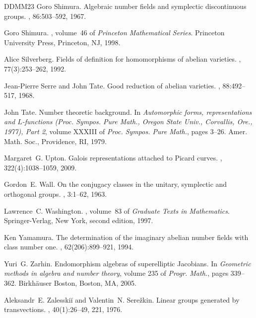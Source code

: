 \documentclass[11pt,a4paper]{article}
\begin{document}
\begin{thebibliography}{DDMM23}
Goro Shimura.
\newblock Algebraic number fields and symplectic discontinuous groups.
, 86:503--592, 1967.

Goro Shimura.
, volume~46 of {\em Princeton Mathematical Series}.
\newblock Princeton University Press, Princeton, NJ, 1998.

Alice Silverberg.
\newblock Fields of definition for homomorphisms of abelian varieties.
, 77(3):253--262, 1992.

Jean-Pierre Serre and John Tate.
\newblock Good reduction of abelian varieties.
, 88:492--517, 1968.

John Tate.
\newblock Number theoretic background.
\newblock In {\em Automorphic forms, representations and {$L$}-functions ({P}roc. {S}ympos. {P}ure {M}ath., {O}regon {S}tate {U}niv., {C}orvallis, {O}re., 1977), {P}art 2}, volume XXXIII of {\em Proc. Sympos. Pure Math.}, pages 3--26. Amer. Math. Soc., Providence, RI, 1979.

Margaret~G. Upton.
\newblock Galois representations attached to {P}icard curves.
, 322(4):1038--1059, 2009.

Gordon~E. Wall.
\newblock On the conjugacy classes in the unitary, symplectic and orthogonal groups.
, 3:1--62, 1963.

Lawrence~C. Washington.
, volume~83 of {\em Graduate Texts in Mathematics}.
\newblock Springer-Verlag, New York, second edition, 1997.

Ken Yamamura.
\newblock The determination of the imaginary abelian number fields with class number one.
, 62(206):899--921, 1994.

Yuri~G. Zarhin.
\newblock Endomorphism algebras of superelliptic {J}acobians.
\newblock In {\em Geometric methods in algebra and number theory}, volume 235 of {\em Progr. Math.}, pages 339--362. Birkh\"auser Boston, Boston, MA, 2005.

Aleksandr~E. Zalesski\u{i} and Valentin~N. Sere\v{z}kin.
\newblock Linear groups generated by transvections.
, 40(1):26--49, 221, 1976.

\end{thebibliography}
\end{document}
